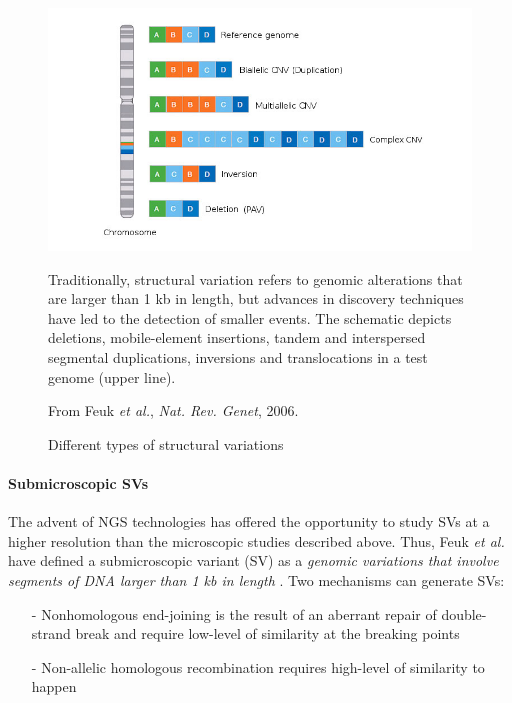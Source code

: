 \documentclass[a4paper, 12pt]{article}
\begin{document}
\begin{onehalfspace}
\newpage %
\thispagestyle{empty}
    \begin{figure}
      \centering \includegraphics[scale=3]{Figures/Figure_3.jpg}
      \vspace{0.5cm}
      \caption{Different types of structural variations} 
      \label{fig:F3}
\footnotesize{Traditionally, structural variation refers to genomic alterations that are larger than 1 kb in length, but advances in discovery techniques have led to the detection of smaller events. The schematic depicts deletions, mobile-element insertions, tandem and interspersed segmental duplications, inversions and translocations in a test genome (upper line).
    
          \begin{flushright}
          From Feuk \textit{et al.}, \textit{Nat. Rev. Genet}, 2006.
          \end{flushright}}
    \end{figure}
\addtocounter{page}{-1}
\newpage
\clearpage %


                \paragraph{Submicroscopic SVs}
                
The advent of NGS technologies has offered the opportunity to study SVs at a higher resolution than the microscopic studies described above. Thus, Feuk \textit{et al.} have defined a submicroscopic variant (SV) as a \textit{genomic variations that involve segments of DNA larger than 1 kb in length} \citep{Feuk2006}. Two mechanisms can generate SVs: 
\begin{itemize}
\item[-] Nonhomologous end-joining is the result of an aberrant repair of double-strand break and require low-level of similarity at the breaking points \citep{Iyama2013}
\item[-] Non-allelic homologous recombination requires high-level of similarity to happen \citep{Hurles2006}
\end{itemize}


\end{onehalfspace}
\end{document}

